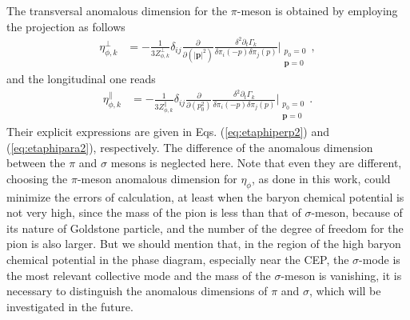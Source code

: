 \documentclass[%
reprint,
superscriptaddress,
showpacs,preprintnumbers,
 amsmath,amssymb,
 aps,
prd,
]{revtex4-1}
\begin{document}
The transversal anomalous dimension for the  $\pi$-meson is obtained by employing the projection as follows
\begin{align}
  \eta_{\phi,k}^{\perp}&=-\frac{1}{3Z_{\phi,k}^{\perp}}\delta_{ij}\frac{\partial}{\partial (|\bm{p}|^2)}\frac{\delta^2 \partial_t \Gamma_k}{\delta \pi_i(-p) \delta \pi_j(p)}\Bigg|_{\substack{p_0=0\\ \bm{p}=0}}\,,\label{eq:etaphiperp}
\end{align}
and the longitudinal one reads
\begin{align}
  \eta_{\phi,k}^{\parallel}&=-\frac{1}{3Z_{\phi,k}^{\parallel}}\delta_{ij}\frac{\partial}{\partial (p_0^2)}\frac{\delta^2 \partial_t \Gamma_k}{\delta \pi_i(-p) \delta \pi_j(p)}\Bigg|_{\substack{p_0=0\\ \bm{p}=0}}\,.\label{eq:etaphipara}
\end{align}
Their explicit expressions are given in Eqs. (\ref{eq:etaphiperp2}) and (\ref{eq:etaphipara2}), respectively. The difference of the anomalous dimension between the $\pi$ and $\sigma$ mesons is neglected here. Note that even they are different, choosing the $\pi$-meson anomalous dimension for $\eta_\phi$, as done in this work, could minimize the errors of calculation, at least when the baryon chemical potential is not very high, since the mass of the pion is less than that of $\sigma$-meson, because of its nature of Goldstone particle, and the number of the degree of freedom for the pion is also larger. But we should mention that, in the region of the high baryon chemical potential in the phase diagram, especially near the CEP, the $\sigma$-mode is the most relevant collective mode and the mass of the $\sigma$-meson is vanishing, it is necessary to distinguish the anomalous dimensions of $\pi$ and $\sigma$, which will be investigated in the future.
\end{document}
